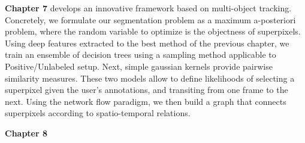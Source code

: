 \textbf{Chapter 7} develops an innovative framework based on multi-object tracking.
Concretely, we formulate our segmentation problem as a maximum a-posteriori problem, where the random variable to optimize is the objectness of superpixels.
Using deep features extracted to the best method of the previous chapter, we train an ensemble of decision trees using a sampling method applicable to Positive/Unlabeled setup.
Next, simple gaussian kernels provide pairwise similarity measures.
These two models allow to define likelihoods of selecting a superpixel given the user's annotations, and transiting from one frame to the next.
Using the network flow paradigm, we then build a graph that connects superpixels according to spatio-temporal relations.

\textbf{Chapter 8}


